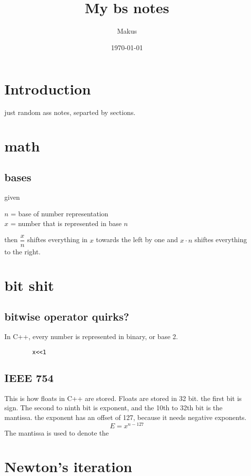 \documentclass{article} %
\title{My bs notes}
\author{Makus}
\date{\today}
\begin{document}
\maketitle


\tableofcontents

\section{Introduction}
    \begin{center}
        just random ass notes, separted by sections.
    \end{center}
\section{math}
    \subsection*{bases}
        given  \begin{center}
            $n$ = base of number representation\\
            $x$ = number that is represented in base $n$
        \end{center}
        then $\dfrac{x}{n}$ shiftes everything in $x$ towards the left by one and $x\cdot n$ shiftes everything to the right.
\section{bit shit}
\subsection{bitwise operator quirks?}
    In C++, every number is represented in binary, or base 2.
    
    \begin{verbatim}
        x<<1
    \end{verbatim}
\subsection{IEEE 754}
    This is how floats in C++ are stored. Floats are stored in 32 bit. the first bit is sign.
    The second to ninth bit is exponent, and the 10th to 32th bit is the mantissa. the exponent has
    an offset of 127, because it needs negative exponents.
    \begin{equation}
        E = x^{n-127}
    \end{equation}
    The mantissa is used to denote the 


\section{Newton's iteration}
\end{document}
